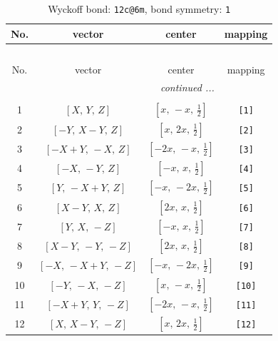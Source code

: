 \documentclass[fleqn,8pt]{jsarticle}
\begin{document}
\begin{longtable}{cccc}
\caption{Wyckoff bond: {\tt 12c@6m}, bond symmetry: {\tt 1}}
 \\
 \hline \hline
No. & vector & center & mapping \\ \hline \endfirsthead

\multicolumn{3}{l}{\tablename\ \thetable{}} \\
 \hline \hline
No. & vector & center & mapping \\ \hline \endhead

 \hline \hline
\multicolumn{3}{r}{\footnotesize\it continued ...} \\ \endfoot

 \hline \hline
\multicolumn{3}{r}{} \\ \endlastfoot

1 & $\left[ X,\, Y,\, Z \right]$ & $\left[ x,\, - x,\, \frac{1}{2} \right]$ & {\tt [1]} \\ \hline
2 & $\left[ - Y,\, X - Y,\, Z \right]$ & $\left[ x,\, 2 x,\, \frac{1}{2} \right]$ & {\tt [2]} \\ \hline
3 & $\left[ - X + Y,\, - X,\, Z \right]$ & $\left[ - 2 x,\, - x,\, \frac{1}{2} \right]$ & {\tt [3]} \\ \hline
4 & $\left[ - X,\, - Y,\, Z \right]$ & $\left[ - x,\, x,\, \frac{1}{2} \right]$ & {\tt [4]} \\ \hline
5 & $\left[ Y,\, - X + Y,\, Z \right]$ & $\left[ - x,\, - 2 x,\, \frac{1}{2} \right]$ & {\tt [5]} \\ \hline
6 & $\left[ X - Y,\, X,\, Z \right]$ & $\left[ 2 x,\, x,\, \frac{1}{2} \right]$ & {\tt [6]} \\ \hline
7 & $\left[ Y,\, X,\, - Z \right]$ & $\left[ - x,\, x,\, \frac{1}{2} \right]$ & {\tt [7]} \\ \hline
8 & $\left[ X - Y,\, - Y,\, - Z \right]$ & $\left[ 2 x,\, x,\, \frac{1}{2} \right]$ & {\tt [8]} \\ \hline
9 & $\left[ - X,\, - X + Y,\, - Z \right]$ & $\left[ - x,\, - 2 x,\, \frac{1}{2} \right]$ & {\tt [9]} \\ \hline
10 & $\left[ - Y,\, - X,\, - Z \right]$ & $\left[ x,\, - x,\, \frac{1}{2} \right]$ & {\tt [10]} \\ \hline
11 & $\left[ - X + Y,\, Y,\, - Z \right]$ & $\left[ - 2 x,\, - x,\, \frac{1}{2} \right]$ & {\tt [11]} \\ \hline
12 & $\left[ X,\, X - Y,\, - Z \right]$ & $\left[ x,\, 2 x,\, \frac{1}{2} \right]$ & {\tt [12]} \\
\end{longtable}
\end{document}
